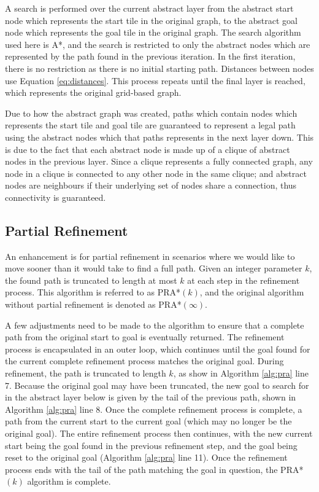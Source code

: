 \documentclass[letterpaper]{article} %
\begin{document}
A search is performed over the current abstract layer from the abstract start node which represents the start tile in the original graph,
to the abstract goal node which represents the goal tile in the original graph.
The search algorithm used here is A*, and the search is restricted to only the abstract nodes which are represented by the path found in the previous iteration.
In the first iteration, there is no restriction as there is no initial starting path.
Distances between nodes use Equation \ref{eq:distances}.
This process repeats until the final layer is reached, which represents the original grid-based graph.

Due to how the abstract graph was created, paths which contain nodes which represents the start tile and goal tile are guaranteed 
to represent a legal path using the abstract nodes which that paths represents in the next layer down.
This is due to the fact that each abstract node is made up of a clique of abstract nodes in the previous layer.
Since a clique represents a fully connected graph, any node in a clique is connected to any other node in the same clique;
and abstract nodes are neighbours if their underlying set of nodes share a connection, thus connectivity is guaranteed. 

\subsection*{Partial Refinement}
An enhancement is for partial refinement in scenarios where we would like to move sooner than it would take to find a full path.
Given an integer parameter $k$, the found path is truncated to length at most $k$ at each step in the refinement process.
This algorithm is referred to as PRA*$(k)$, and the original algorithm without partial refinement is denoted as PRA*$(\infty)$.

A few adjustments need to be made to the algorithm to ensure that a complete path from the original start to goal is eventually returned.
The refinement process is encapsulated in an outer loop, 
which continues until the goal found for the current complete refinement process matches the original goal.
During refinement, the path is truncated to length $k$, as show in Algorithm \ref{alg:pra} line 7.
Because the original goal may have been truncated, the new goal to search for in the abstract layer below is given by the tail of the previous path,
shown in Algorithm \ref{alg:pra} line 8.
Once the complete refinement process is complete, 
a path from the current start to the current goal (which may no longer be the original goal).
The entire refinement process then continues, with the new current start being the goal found in the previous refinement step,
and the goal being reset to the original goal (Algorithm \ref{alg:pra} line 11).
Once the refinement process ends with the tail of the path matching the goal in question, the PRA*$(k)$ algorithm is complete.
\end{document}
